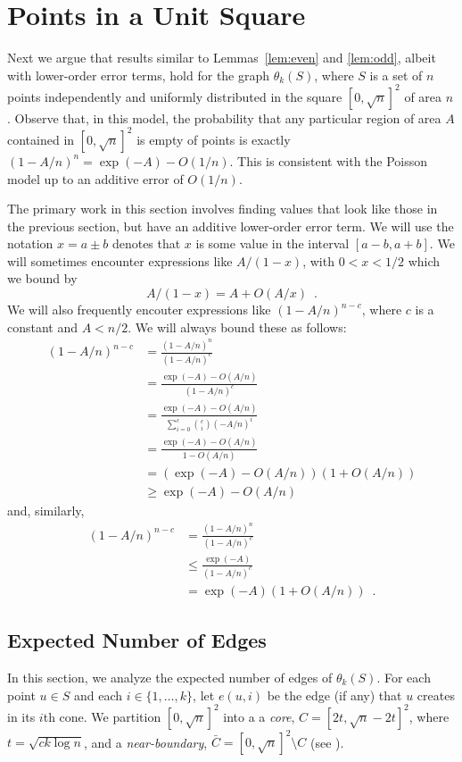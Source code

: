 \documentclass{patmorin}
\begin{document}
\section{Points in a Unit Square}

Next we argue that results similar to Lemmas~\ref{lem:even} and
\ref{lem:odd}, albeit with lower-order error terms, hold for the
graph $\theta_k(S)$, where $S$ is a set of $n$ points independently
and uniformly distributed in the square $[0,\sqrt{n}]^2$ of area $n$.
Observe that, in this model, the probability that any particular region
of area $A$ contained in $[0,\sqrt{n}]^2$ is empty of points is exactly
$(1-A/n)^n=\exp(-A)-O(1/n)$.  This is consistent with the Poisson model
up to an additive error of $O(1/n)$.

The primary work in this section involves finding values that look like
those in the previous section, but have an additive lower-order error term.
We will use the notation $x= a\pm b$ denotes that $x$ is some value in the interval $[a-b,a+b]$.  We will sometimes encounter expressions like
$A/(1-x)$, with $0<x<1/2$ which we bound by
\[
   A/(1-x) = A+O(A/x) \enspace .
\]
We will also frequently encouter expressions like $(1-A/n)^{n-c}$, where
$c$ is a constant and $A < n/2$.  We will always bound these as follows:
\begin{align*}
   (1-A/n)^{n-c} 
      & = \frac{(1-A/n)^n}{(1-A/n)^c} \\
      & = \frac{\exp(-A)-O(A/n)}{(1-A/n)^c} \\
      & = \frac{\exp(-A)-O(A/n)}{\sum_{i=0}^c \binom{c}{i}(-A/n)^i} \\
      & = \frac{\exp(-A)-O(A/n)}{1-O(A/n)} \\
      & = (\exp(-A)-O(A/n))(1+O(A/n)) \\
      & \ge \exp(-A) - O(A/n) 
\end{align*}
and, similarly, 
\begin{align*}
   (1-A/n)^{n-c} 
      & = \frac{(1-A/n)^n}{(1-A/n)^c} \\
      & \le \frac{\exp(-A)}{(1-A/n)^c} \\
      & = \exp(-A)(1+O(A/n))  \enspace .
\end{align*}


\subsection{Expected Number of Edges}

In this section, we analyze the expected number of edges of $\theta_k(S)$.
For each point $u\in S$ and each $i\in\{1,\ldots,k\}$, let $e(u,i)$ be
the edge (if any) that $u$ creates in its $i$th cone.  We partition
$[0,\sqrt{n}]^2$ into a a \emph{core}, $C=[2t,\sqrt{n}-2t]^2$,
where $t=\sqrt{ck\log n}$, and a \emph{near-boundary},
$\bar{C}=[0,\sqrt{n}]^2\setminus C$ (see ).
\end{document}

